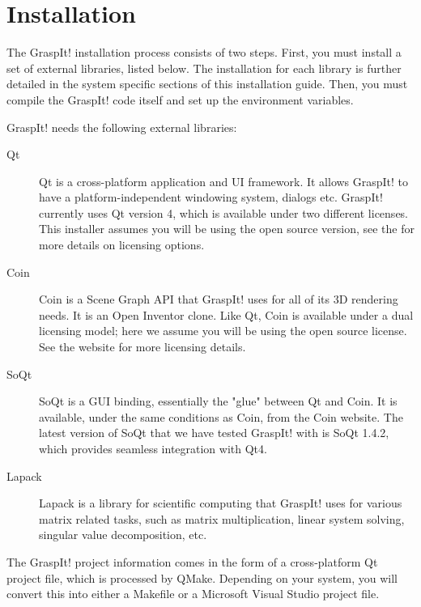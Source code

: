 \section{Installation}


The GraspIt! installation process consists of two steps. First, you
must install a set of external libraries, listed below. The
installation for each library is further detailed in the system
specific sections of this installation guide. Then, you must compile
the GraspIt! code itself and set up the environment variables.

GraspIt! needs the following external libraries:

\begin{description}
\item[Qt] Qt is a cross-platform application and UI framework. It
  allows GraspIt! to have a platform-independent windowing system,
  dialogs etc. GraspIt! currently uses Qt version 4, which is
  available under two different licenses. This installer assumes you
  will be using the open source version, see the  for more details on licensing
  options.

\item[Coin] Coin is a Scene Graph API that GraspIt! uses for all of
  its 3D rendering needs. It is an Open Inventor clone. Like Qt, Coin
  is available under a dual licensing model; here we assume you will
  be using the open source license. See the
   website for more licensing
  details.

\item[SoQt] SoQt is a GUI binding, essentially the "glue" between Qt
  and Coin. It is available, under the same conditions as Coin, from
  the Coin website. The latest version of SoQt that we have tested
  GraspIt! with is SoQt 1.4.2, which provides seamless integration
  with Qt4.

\item[Lapack] Lapack is a library for scientific computing that
  GraspIt! uses for various matrix related tasks, such as matrix
  multiplication, linear system solving, singular value decomposition,
  etc.
\end{description}

The GraspIt! project information comes in the form of a cross-platform
Qt project file, which is processed by QMake. Depending on your
system, you will convert this into either a Makefile or a Microsoft
Visual Studio project file.
